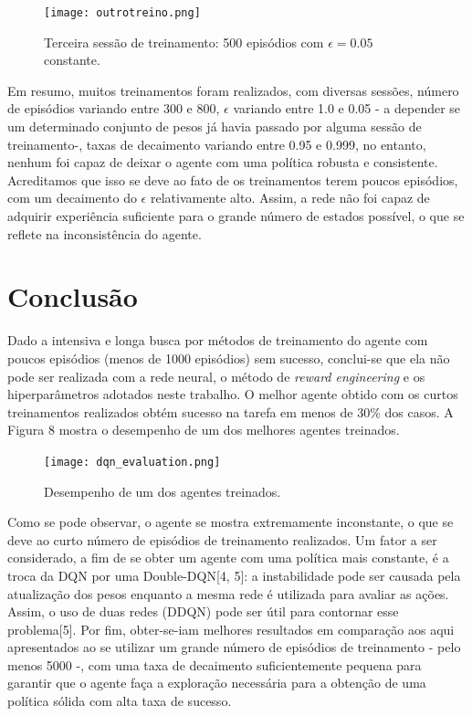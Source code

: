 \documentclass[letterpaper, 10 pt, conference]{ieeeconf}  %
\begin{document}
\begin{figure}[H]
\centering
\texttt{[image: outrotreino.png]}
\caption{Terceira sessão de treinamento: 500 episódios com $\epsilon=0.05$ constante.}
\label{fig:comparacao}
\end{figure}

Em resumo, muitos treinamentos foram realizados, com diversas sessões, número de episódios variando entre 300 e 800, $\epsilon$ variando entre 1.0 e 0.05 - a depender se um determinado conjunto de pesos já havia passado por alguma sessão de treinamento-, taxas de decaimento variando entre 0.95 e 0.999, no entanto, nenhum foi capaz de deixar o agente com uma política robusta e consistente. Acreditamos que isso se deve ao fato de os treinamentos terem poucos episódios, com um decaimento do $\epsilon$ relativamente alto. Assim, a rede não foi capaz de adquirir experiência suficiente para o grande número de estados possível, o que se reflete na inconsistência do agente. 

 
\section{Conclusão}

Dado a intensiva e longa busca por métodos de treinamento do agente com poucos episódios (menos de 1000 episódios) sem sucesso, conclui-se que ela não pode ser realizada com a rede neural, o método de \emph{reward engineering} e os hiperparâmetros adotados neste trabalho. O melhor agente obtido com os curtos treinamentos realizados obtém sucesso na tarefa em menos de 30\% dos casos. A Figura 8 mostra o desempenho de um dos melhores agentes treinados. 

\begin{figure}[H]
\centering
\texttt{[image: dqn\_evaluation.png]}
\caption{Desempenho de um dos agentes treinados.}
\label{fig:comparacao}
\end{figure}

Como se pode observar, o agente se mostra extremamente inconstante, o que se deve ao curto número de episódios de treinamento realizados. Um fator a ser considerado, a fim de se obter um agente com uma política mais constante, é a troca da DQN por uma Double-DQN[4, 5]: a instabilidade pode ser causada pela atualização dos pesos enquanto a mesma rede é utilizada para avaliar as ações. Assim, o uso de duas redes (DDQN) pode ser útil para contornar esse problema[5].
Por fim, obter-se-iam melhores resultados em comparação aos aqui apresentados ao se utilizar um grande número de episódios de treinamento - pelo menos 5000 -, com uma taxa de decaimento suficientemente pequena para garantir que o agente faça a exploração necessária para a obtenção de uma política sólida com alta taxa de sucesso. 
\end{document}
